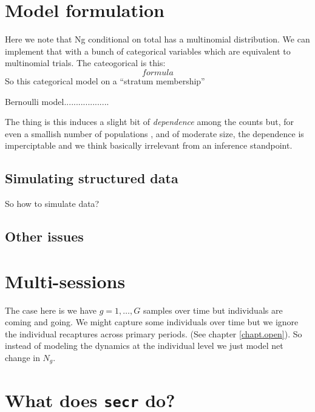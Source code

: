 \begin{comment}
In this model, to implement it, we can have our da variables z[i] but
then we have to split each real guy into the 2 groups. To do that we
have g[i] a cateogrical individual effect which has probabilitys
pi[1] = lambda[1]/(lambda[1]+lambda[2])... where is this going?



So the idea is that we work with the binomial model doing a 
``data augmenation on the total'' instead of data augmenting each
population by itself. 

In this case then , in the general case, the Ng are, conditional on
Ntotal, multinomial with probabilities pi(g) = lambda(g)/sum lambda(g).
\end{comment}





\section{Model formulation}

Here we note that Ng conditional on total has a multinomial
distribution. We can implement that with a bunch of categorical
variables which are equivalent to multinomial trials.  The
cateogorical is this:
\[
formula
\]
So this categorical model on a ``stratum membership''

Bernoulli model...................


The thing is this induces a slight bit of {\it dependence} among the
counts but, for even a smallish number of populations , and of
moderate size, the dependence is imperciptable and we think basically
irrelevant from an inference standpoint. 

\subsection{Simulating structured data}

So how to simulate data?


\subsection{Other issues}


\section{Multi-sessions}

The case here is we have $g=1,\ldots,G$ samples over time but
individuals are coming and going.
We might capture some individuals over time but we ignore the
individual recaptures across primary periods. (See chapter
\ref{chapt.open}). So instead of modeling the dynamics at the individual
level we just model net change in $N_{g}$.


\section{What does \mbox{\tt secr} do?}



